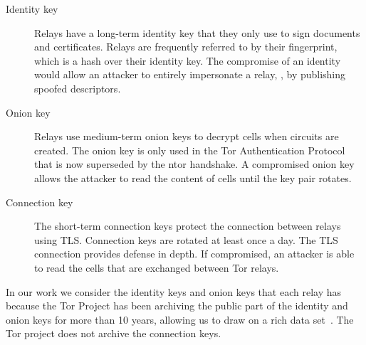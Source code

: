 \begin{description}
    \item[Identity key]  Relays have a long-term identity key that they only use
        to sign documents and certificates.  Relays are frequently referred to
        by their fingerprint, which is a hash over their identity key.  The
        compromise of an identity would allow an attacker to entirely
        impersonate a relay, \eg, by publishing spoofed descriptors.
    \item[Onion key]  Relays use medium-term onion keys to decrypt cells when
        circuits are created.  The onion key is only used in the Tor
        Authentication Protocol that is now superseded by the ntor handshake.  A
        compromised onion key allows the attacker to read the content of cells
        until the key pair rotates.
    \item[Connection key] The short-term connection keys protect the connection
        between relays using TLS.  Connection keys are rotated at least once a
        day.  The TLS connection provides defense in depth.  If compromised, an
        attacker is able to read the cells that are exchanged between Tor
        relays.
\end{description}

In our work we consider the identity keys and onion keys that each relay 
has because the Tor Project has been archiving the public part of the 
identity and onion keys for more than 10 years, allowing us to draw on a 
rich data set~\cite{collector}. The Tor project does not archive the 
connection keys.


